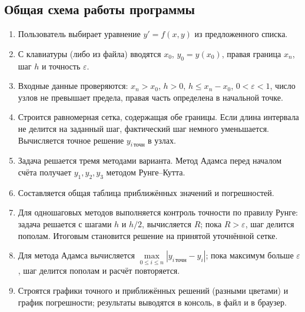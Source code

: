 \documentclass[12pt,a4paper]{article}
\begin{document}
\subsection{Общая схема работы программы}
\begin{enumerate}[label=\arabic*.,leftmargin=1.2cm]
\item Пользователь выбирает уравнение $y'=f(x,y)$ из предложенного списка.
\item С клавиатуры (либо из файла) вводятся $x_0$, $y_0=y(x_0)$, правая
граница $x_n$, шаг $h$ и точность $\varepsilon$.
\item Входные данные проверяются: $x_n>x_0$, $h>0$, $h\le x_n-x_0$,
$0<\varepsilon<1$, число узлов не превышает предела, правая часть определена
в начальной точке.
\item Строится равномерная сетка, содержащая обе границы. Если длина интервала
не делится на заданный шаг, фактический шаг немного уменьшается. Вычисляется
точное решение $y_{i\,\text{точн}}$ в узлах.
\item Задача решается тремя методами варианта. Метод Адамса перед началом
счёта получает $y_1,y_2,y_3$ методом Рунге--Кутта.
\item Составляется общая таблица приближённых значений и погрешностей.
\item Для одношаговых методов выполняется контроль точности по правилу Рунге:
задача решается с шагами $h$ и $h/2$, вычисляется $R$; пока $R>\varepsilon$,
шаг делится пополам. Итоговым становится решение на принятой уточнённой сетке.
\item Для метода Адамса вычисляется
$\max\limits_{0\le i\le n}|y_{i\,\text{точн}}-y_i|$; пока максимум больше
$\varepsilon$, шаг делится пополам и расчёт повторяется.
\item Строятся графики точного и приближённых решений (разными цветами) и
график погрешности; результаты выводятся в консоль, в файл и в браузер.
\end{enumerate}
\end{document}

